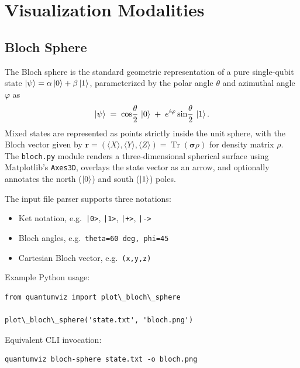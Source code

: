 \documentclass{SciPost}
\begin{document}
\section{Visualization Modalities}
\label{sec:modalities}

\subsection{Bloch Sphere}

The Bloch sphere is the standard geometric representation of a pure
single-qubit state $\ket{\psi} = \alpha\ket{0} + \beta\ket{1}$,
parameterized by the polar angle $\theta$ and azimuthal angle $\varphi$ as
\begin{equation}
  \ket{\psi}
  \;=\;
  \cos\!\frac{\theta}{2}\,\ket{0}
  \;+\;
  e^{i\varphi}\sin\!\frac{\theta}{2}\,\ket{1}.
  \label{eq:bloch_state}
\end{equation}
Mixed states are represented as points strictly inside the unit sphere, with
the Bloch vector given by
$\mathbf{r} = (\langle X\rangle,\langle Y\rangle,\langle Z\rangle)
 = \operatorname{Tr}(\boldsymbol{\sigma}\rho)$
for density matrix $\rho$.
The \texttt{bloch.py} module renders a three-dimensional spherical surface
using Matplotlib's \texttt{Axes3D}, overlays the state vector as an arrow,
and optionally annotates the north ($\ket{0}$) and south ($\ket{1}$) poles.

The input file parser supports three notations:
\begin{itemize}
  \item Ket notation, e.g.\ \lstinline{|0>}, \lstinline{|1>},
        \lstinline{|+>}, \lstinline{|->}
  \item Bloch angles, e.g.\ \lstinline{theta=60 deg, phi=45}
  \item Cartesian Bloch vector, e.g.\ \lstinline{(x,y,z)}
\end{itemize}

\noindent Example Python usage:
\begin{lstlisting}
from quantumviz import plot\_bloch\_sphere

plot\_bloch\_sphere('state.txt', 'bloch.png')
\end{lstlisting}

\noindent Equivalent CLI invocation:
\begin{lstlisting}
quantumviz bloch-sphere state.txt -o bloch.png
\end{lstlisting}
\end{document}
